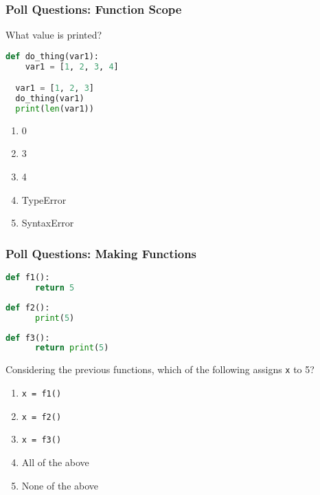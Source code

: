 \documentclass{beamer}
\begin{document}
%
%
\begin{frame}[fragile]
  \frametitle{Poll Questions: Function Scope}
  What value is printed?
  \begin{lstlisting}[language=Python, autogobble]
  def do_thing(var1):
    var1 = [1, 2, 3, 4]

  var1 = [1, 2, 3]
  do_thing(var1)
  print(len(var1))
  \end{lstlisting}
  \vfill
  \begin{enumerate}[A]
    \item 0
    \item 3 
    \item 4
    \item TypeError
    \item SyntaxError
  \end{enumerate}
\end{frame}

%
%
\begin{frame}[fragile]
  \frametitle{Poll Questions: Making Functions}
  \begin{minipage}{0.29\textwidth}
    \centering
    \begin{lstlisting}[language=Python, autogobble]
    def f1():
      return 5
    \end{lstlisting}
  \end{minipage}
  \hfill
  \begin{minipage}{0.29\textwidth}
    \centering
    \begin{lstlisting}[language=Python, autogobble]
    def f2():
      print(5)
    \end{lstlisting}
  \end{minipage}
  \hfill
  \begin{minipage}{0.29\textwidth}
    \centering
    \begin{lstlisting}[language=Python, autogobble]
    def f3():
      return print(5)
    \end{lstlisting}
  \end{minipage}
  \vfill
  Considering the previous functions, which of the following assigns \lstinline|x| to 5?
  \centering
  \begin{enumerate}[A]
    \item \lstinline|x = f1()|
    \item \lstinline|x = f2()|
    \item \lstinline|x = f3()|
    \item All of the above
    \item None of the above
  \end{enumerate}
\end{frame}
\end{document}
